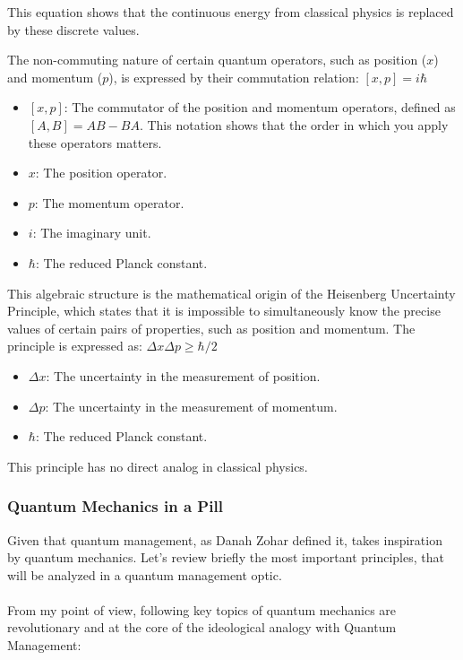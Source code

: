 \documentclass{article}
\begin{document}
This equation shows that the continuous energy from classical physics is replaced by these discrete values.



The non-commuting nature of certain quantum operators, such as position ($x$) and momentum ($p$), is expressed by their commutation relation:
$[x,p] = i\hbar$

\begin{itemize}
	\item $[x,p]$: The commutator of the position and momentum operators, defined as $[A, B] = AB - BA$. This notation shows that the order in which you apply these operators matters.
	\item $x$: The position operator.
	\item $p$: The momentum operator.
	\item $i$: The imaginary unit.
	\item $\hbar$: The reduced Planck constant.
\end{itemize}

This algebraic structure is the mathematical origin of the Heisenberg Uncertainty Principle, which states that it is impossible to simultaneously know the precise values of certain pairs of properties, such as position and momentum. The principle is expressed as:
$\Delta x \Delta p \geq \hbar/2$

\begin{itemize}
	\item $\Delta x$: The uncertainty in the measurement of position.
	\item $\Delta p$: The uncertainty in the measurement of momentum.
	\item $\hbar$: The reduced Planck constant.
\end{itemize}

This principle has no direct analog in classical physics.
\newpage
\subsubsection*{Quantum Mechanics in a Pill}
Given that quantum management, as Danah Zohar defined it, takes inspiration by quantum mechanics. Let's review briefly the most important principles, that will be analyzed in a quantum management optic.
\\\\
From my point of view, following key topics of quantum mechanics are revolutionary and at the core of the ideological analogy with Quantum Management:
\end{document}
